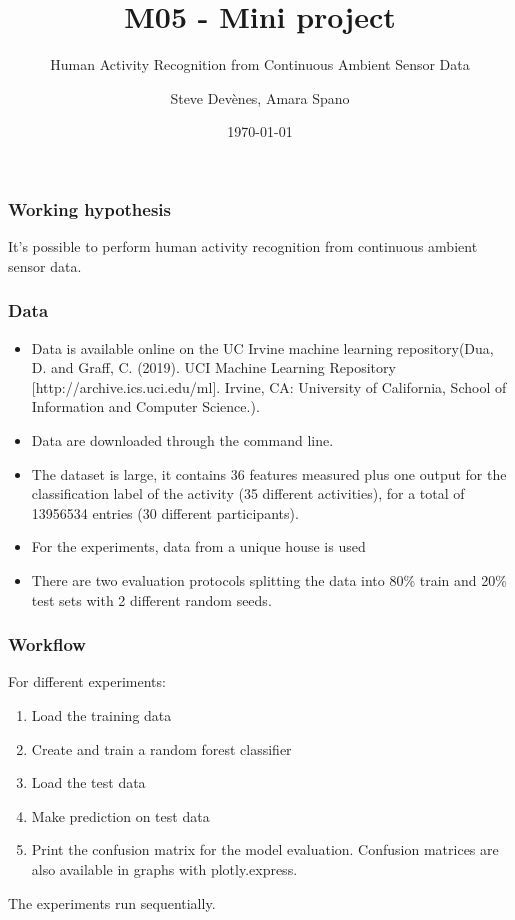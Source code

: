 \documentclass{beamer}
\title{M05 - Mini project}
\subtitle{Human Activity Recognition from Continuous Ambient Sensor Data}
\author{Steve Devènes, Amara Spano}
\institute{Unidistance}
\date{\today}
\begin{document}
	\begin{frame}
		\titlepage
	\end{frame}



	\begin{frame}
		\frametitle{Working hypothesis}
		It's possible to perform human activity recognition from continuous ambient sensor data.
	\end{frame}

	\begin{frame}
		\frametitle{Data}
		\begin{itemize}
			\item Data is available online on the UC Irvine machine learning repository(Dua, D. and Graff, C. (2019). UCI Machine Learning Repository [http://archive.ics.uci.edu/ml]. Irvine, CA: University of California, School of Information and Computer Science.).
			\item Data are downloaded through the command line.
			\item The dataset is large, it contains 36 features measured plus one output for the classification label
			of the activity (35 different activities), for a total of 13956534 entries (30 different participants).
			\item For the experiments, data from a unique house is used
			\item There are two evaluation protocols splitting the data into 80\% train and 20\% test sets with 2 different random seeds.
		\end{itemize}
	\end{frame}

	\begin{frame}
		\frametitle{Workflow}
		For different experiments:
		\begin{enumerate}
			\item Load the training data
			\item Create and train a random forest classifier
			\item Load the test data
			\item Make prediction on test data
			\item Print the confusion matrix for the model evaluation. Confusion matrices are also available in graphs with plotly.express.
		\end{enumerate}

		The experiments run sequentially.
	\end{frame}
\end{document}
